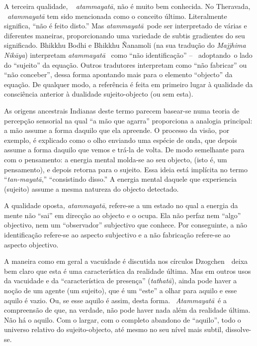 A terceira qualidade, ~ \emph{atammayatā}, não é muito bem conhecida. No
Theravada, ~\emph{atammayatā} tem sido mencionada como o conceito
último. Literalmente significa, ``não é feito disto.'' Mas
\emph{atammayatā}~pode ser interpretado de várias e diferentes maneiras,
proporcionando uma variedade de subtis gradientes do seu significado.
Bhikkhu Bodhi e Bhikkhu Ñanamoli (na sua tradução do \emph{Majjhima
Nikāya}) interpretam \emph{atammayatā}~ como ``não identificação'' --
~adoptando~o lado do ``sujeito'' da equação. Outros tradutores
interpretam como ``não fabricar'' ou ``não conceber'', dessa forma
apontando mais para o elemento ``objecto'' da equação. De qualquer modo,
a referência é feita em primeiro lugar à qualidade da consciência
anterior à dualidade sujeito-objecto (ou sem esta).~

As origens ancestrais Indianas deste termo parecem basear-se numa teoria
de percepção sensorial na qual ``a mão que agarra'' proporciona a
analogia principal: a mão assume a forma daquilo que ela apreende. O
processo da visão, por exemplo, é explicado como o olho enviando uma
espécie de onda, que depois assume a forma daquilo que vemos e trá-la de
volta. De modo semelhante para com o pensamento: a energia mental
molda-se ao seu objecto, (isto é, um pensamento), e depois retorna para
o sujeito. Essa ideia está implícita no termo ``\emph{tan-mayatā},''
``consistindo disso.'' A energia mental daquele que experiencia
(sujeito) assume a mesma natureza do objecto detectado.

A qualidade oposta\emph{, atammayatā}, refere-se a um estado no qual a
energia da mente não ``sai'' em direcção ao objecto e o ocupa. Ela não
perfaz nem ``algo'' objectivo, nem um ``observador'' subjectivo que
conhece. Por conseguinte, a não identificação refere-se ao aspecto
subjectivo e a não fabricação refere-se ao aspecto objectivo.

A maneira como em geral a vacuidade é discutida nos círculos
Dzogchen~~deixa bem claro que esta é uma característica da realidade
última. Mas em outros usos da vacuidade e da ``característica de
presença'' (\emph{tathatā}), ainda pode haver a noção de um agente (um
sujeito), que é um ``este'' a olhar para aquilo e esse aquilo é vazio.
Ou, se esse aquilo é assim, desta forma. ~\emph{Atammayatā}~é a
compreensão de que, na verdade, não pode haver nada além da realidade
última. Não há o aquilo. Com o largar, com o completo abandono de
``aquilo'', todo o universo relativo do sujeito-objecto, até mesmo no
seu nível mais subtil, dissolve-se.

